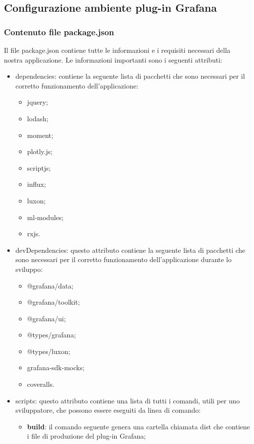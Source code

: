 \subsection{Configurazione ambiente plug-in Grafana}
\subsubsection{Contenuto file package.json}
Il file package.json contiene tutte le informazioni e i requisiti necessari della nostra applicazione. Le informazioni importanti sono i seguenti attributi:
\begin{itemize}
	\item dependencies: contiene la seguente lista di pacchetti che sono necessari per il corretto funzionamento dell'applicazione:
		\begin{itemize}
			\item jquery;
			\item lodash;
			\item moment;
			\item plotly.js;
			\item scriptjs;
			\item influx;
			\item luxon;
			\item ml-modules;
			\item rxjs.
		\end{itemize}
	\item devDependencies: questo attributo contiene la seguente lista di pacchetti che sono necessari per il corretto funzionamento dell'applicazione durante lo sviluppo:
		\begin{itemize}
			\item @grafana/data;
			\item @grafana/toolkit;
			\item @grafana/ui;
			\item @types/grafana;
			\item @types/luxon;
			\item grafana-sdk-mocks;
			\item coveralls.
		\end{itemize}
	\item{scripts}: questo attributo contiene una lista di tutti i comandi, utili per uno sviluppatore, che possono essere eseguiti da linea di comando:
		\begin{itemize}
			\item \textbf{build}: il comando seguente genera una cartella chiamata dist che contiene i file di produzione del plug-in Grafana\glo;

\end{itemize}
\end{itemize}

